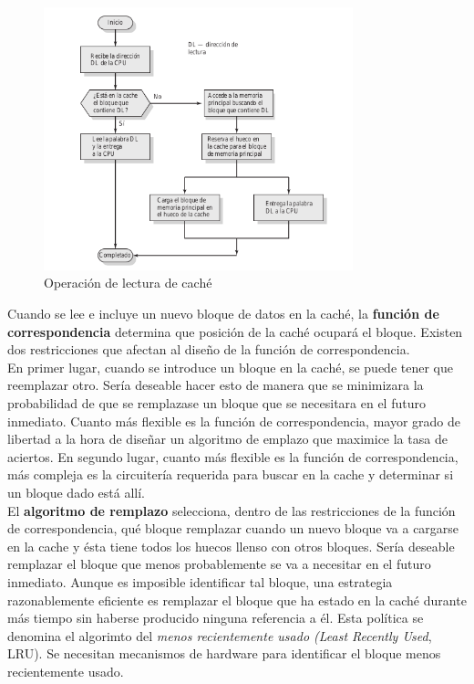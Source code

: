 \documentclass{article}
\begin{document}
			\begin{figure}
			\centering
			\caption{Operación de lectura de caché}
			\label{3.2: operación de lectura de cahce}
			\includegraphics[width=0.8\textwidth, scale=1]{tema_3_figura2.png}
			\end{figure}
			
			Cuando se lee e incluye un nuevo bloque de datos en la caché, la \textbf{función de correspondencia} determina que posición de la caché ocupará el bloque. Existen dos restricciones que afectan al diseño de la función de correspondencia. \\
			
			En primer lugar, cuando se introduce un bloque en la caché, se puede tener que reemplazar otro. Sería deseable hacer esto de manera que se minimizara la probabilidad de que se remplazase un bloque que se necesitara en el futuro inmediato. Cuanto más flexible es la función de correspondencia, mayor grado de libertad a la hora de diseñar un algoritmo de emplazo que maximice la tasa de aciertos. En segundo lugar, cuanto más flexible es la función de correspondencia, más compleja es la circuitería requerida para buscar en la cache y determinar si un bloque dado está allí. \\
			
			El \textbf{algoritmo de remplazo} selecciona, dentro de las restricciones de la función de correspondencia, qué bloque remplazar cuando un nuevo bloque va a cargarse en la cache y ésta tiene todos los huecos llenso con otros bloques. Sería deseable remplazar el bloque que menos probablemente se va a necesitar en el futuro inmediato. Aunque es imposible identificar tal bloque, una estrategia razonablemente eficiente es remplazar el bloque que ha estado en la caché durante más tiempo sin haberse producido ninguna referencia a él. Esta política se denomina el algorimto del \textit{menos recientemente usado (Least Recently Used}, LRU). Se necesitan mecanismos de hardware para identificar el bloque menos recientemente usado. \\
			
\end{document}
